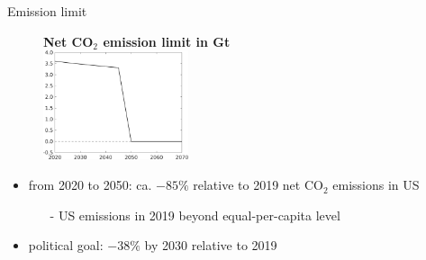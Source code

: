 \documentclass[11pt,aspectratio=169]{beamer}
\newcommand{\ar}{$\Rightarrow$ \ }
\begin{document}
\begin{frame}{Emission limit}
	\vspace{-3mm}
	\begin{center}
		\begin{figure}
			\centering
			\textbf{Net CO$_2$ emission limit in Gt}\\
			\vspace{2mm}	\includegraphics[width=0.38\textwidth]{../codding_model/own_basedOnFried/optimalPol_010922_revision/figures/all_13Sept22_Tplus30/Emnet.png}
		\end{figure}
	\end{center}
	\pause
	
\begin{itemize}
	\item<+-> from 2020 to 2050: ca. $-85\%$ relative to 2019 net CO$_2$ emissions in US
	\vspace{2mm}
	\begin{itemize}
		\item[-] US emissions in 2019 beyond equal-per-capita level
	\end{itemize}
\vspace{2mm}
	\item<+-> political goal: $-38\%$ by 2030 relative to 2019
\end{itemize}
\end{frame}
\end{document}
